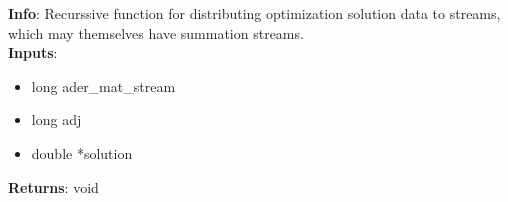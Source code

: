 \textbf{Info}: Recurssive function for distributing optimization solution data
to streams, which may themselves have summation streams. \\

\noindent \textbf{Inputs}:
\begin{itemize}
\item{long ader\_mat\_stream}
\item{long adj}
\item{double *solution}
\end{itemize}

\noindent \textbf{Returns}: void
